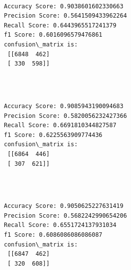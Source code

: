\documentclass[11pt]{article}
\begin{document}
    

    \begin{center}
    \end{center}
    { \hspace*{\fill} \\}
    
    

    \begin{Verbatim}[commandchars=\\\{\}]
Accuracy Score: 0.9038601602330663
Precision Score: 0.5641509433962264
Recall Score: 0.6443965517241379
f1 Score: 0.6016096579476861
confusion\_matrix is: 
 [[6848  462]
 [ 330  598]] 


    \end{Verbatim}

    \begin{center}
    \end{center}
    { \hspace*{\fill} \\}
    
    \begin{Verbatim}[commandchars=\\\{\}]
Accuracy Score: 0.9085943190094683
Precision Score: 0.5820056232427366
Recall Score: 0.6691810344827587
f1 Score: 0.6225563909774436
confusion\_matrix is: 
 [[6864  446]
 [ 307  621]] 


    \end{Verbatim}

   

    \begin{center}
    \end{center}
    { \hspace*{\fill} \\}
    
    \begin{Verbatim}[commandchars=\\\{\}]
Accuracy Score: 0.9050625227631419
Precision Score: 0.5682242990654206
Recall Score: 0.6551724137931034
f1 Score: 0.6086086086086087
confusion\_matrix is: 
 [[6847  462]
 [ 320  608]] 


    \end{Verbatim}

  

    \begin{center}
    \end{center}
    { \hspace*{\fill} \\}
    
\end{document}
